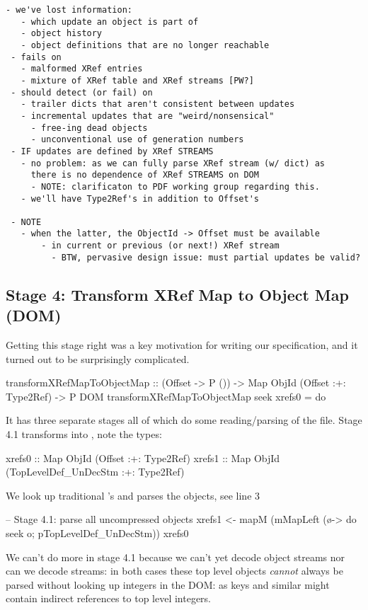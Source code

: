 \begin{lstlisting}[style=meta]
 - we've lost information:
   - which update an object is part of
   - object history
   - object definitions that are no longer reachable
 - fails on
   - malformed XRef entries
   - mixture of XRef table and XRef streams [PW?]
 - should detect (or fail) on
   - trailer dicts that aren't consistent between updates
   - incremental updates that are "weird/nonsensical"
     - free-ing dead objects
     - unconventional use of generation numbers
 - IF updates are defined by XRef STREAMS
   - no problem: as we can fully parse XRef stream (w/ dict) as
     there is no dependence of XRef STREAMS on DOM
     - NOTE: clarificaton to PDF working group regarding this.
   - we'll have Type2Ref's in addition to Offset's
      
 - NOTE 
   - when the latter, the ObjectId -> Offset must be available
       - in current or previous (or next!) XRef stream
         - BTW, pervasive design issue: must partial updates be valid?
\end{lstlisting}


\subsection{Stage 4: Transform XRef Map to Object Map (DOM)}

Getting this stage right was a key motivation for writing our
specification, and it turned out to be surprisingly complicated.
\begin{code}
transformXRefMapToObjectMap
  :: (Offset -> P ()) -> Map ObjId (Offset :+: Type2Ref) -> P DOM
transformXRefMapToObjectMap seek xrefs0 = do
\end{code}
It has three separate stages all of which do some reading/parsing of
the file. Stage 4.1
transforms  into , note the types:
\begin{codeNoExecute}
  xrefs0 :: Map ObjId (Offset               :+: Type2Ref) 
  xrefs1 :: Map ObjId (TopLevelDef_UnDecStm :+: Type2Ref)
\end{codeNoExecute}
%
We look up traditional 's and parses the objects,
see line 3
\begin{code}
    -- Stage 4.1: parse all uncompressed objects
    xrefs1 <- mapM
                (mMapLeft (\o-> do {seek o; pTopLevelDef_UnDecStm}))
                xrefs0
\end{code}
We can't do more in stage 4.1 because we can't yet decode
object streams nor can we decode streams: in both cases these top
level objects \emph{cannot} always be parsed without looking up
integers in the DOM: as  keys and similar might contain
indirect references to top level integers.

